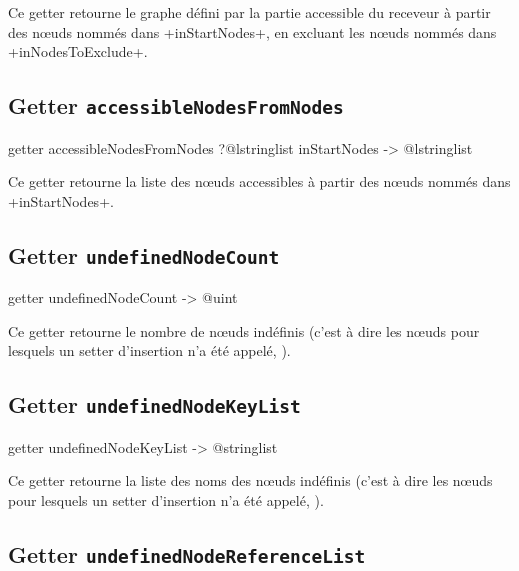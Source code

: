 Ce getter retourne le graphe défini par la partie accessible du receveur à partir des nœuds nommés dans \ggs+inStartNodes+, en excluant les nœuds nommés dans \ggs+inNodesToExclude+.






\subsection{Getter \texttt{accessibleNodesFromNodes}}

\begin{galgas}
getter accessibleNodesFromNodes
  ?@lstringlist inStartNodes
  -> @lstringlist 
\end{galgas}

Ce getter retourne la liste des nœuds accessibles à partir des nœuds nommés dans \ggs+inStartNodes+.






\subsection{Getter \texttt{undefinedNodeCount}}

\begin{galgas}
getter undefinedNodeCount -> @uint 
\end{galgas}

Ce getter retourne le nombre de nœuds indéfinis (c'est à dire les nœuds pour lesquels un setter d'insertion n'a été appelé, ).







\subsection{Getter \texttt{undefinedNodeKeyList}}

\begin{galgas}
getter undefinedNodeKeyList -> @stringlist 
\end{galgas}

Ce getter retourne la liste des noms des nœuds indéfinis (c'est à dire les nœuds pour lesquels un setter d'insertion n'a été appelé, ).








\subsection{Getter \texttt{undefinedNodeReferenceList}}

